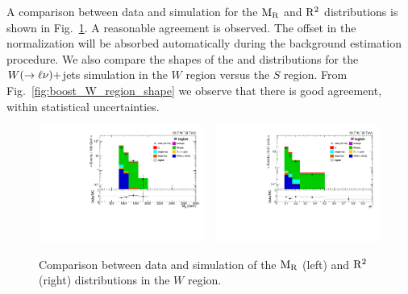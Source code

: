 A comparison between data and simulation for the $\mathrm{M_R}$ and $\mathrm{R^2}$ distributions is shown in
Fig.~\ref{fig:boost_W_region_MR_Rsq}. A reasonable agreement is observed. The offset in the
normalization will be absorbed automatically during the background estimation procedure. 
We also compare the shapes of the \mr and \rsq distributions for the
$W(\rightarrow\ell\nu)+$jets
simulation in the $W$ region versus the $S$ region. From Fig.~\ref{fig:boost_W_region_shape} we
observe that there is good agreement, within statistical uncertainties. 
 
\begin{figure}[htbp]
\centering
\includegraphics[width=0.48\textwidth]
{figures/razor_selection/plots/DataMC_MR_0Lbg1Y1LlmT_mdPhig0p5_width}
~
\includegraphics[width=0.48\textwidth]
{figures/razor_selection/plots/DataMC_R2_0Lbg1Y1LlmT_mdPhig0p5_width}
\caption{Comparison between data and simulation of the $\mathrm{M_R}$ (left) and $\mathrm{R^2}$ (right)
distributions in the $W$ region. 
\label{fig:boost_W_region_MR_Rsq}}
\end{figure}

